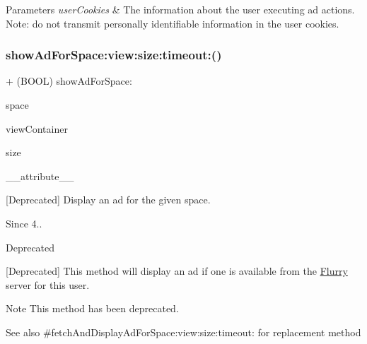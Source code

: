 \begin{DoxyParams}{Parameters}
{\em user\+Cookies} & The information about the user executing ad actions. Note\+: do not transmit personally identifiable information in the user cookies. \\
\hline
\end{DoxyParams}
\mbox{\label{interfaceFlurryAds_a8d460375f558369833a1f43e568ed137}} 
\subsubsection{\texorpdfstring{show\+Ad\+For\+Space\+:view\+:size\+:timeout\+:()}{showAdForSpace:view:size:timeout:()}}
{\footnotesize\ttfamily + (B\+O\+OL) show\+Ad\+For\+Space\+: \begin{DoxyParamCaption}\item[{(N\+S\+String $\ast$)}]{space }\item[{view:(U\+I\+View $\ast$)}]{view\+Container }\item[{size:(Flurry\+Ad\+Size)}]{size }\item[{timeout:((deprecated))}]{\+\_\+\+\_\+attribute\+\_\+\+\_\+ }\end{DoxyParamCaption}}



\mbox{[}Deprecated\mbox{]} Display an ad for the given {\ttfamily space}. 

\begin{DoxySince}{Since}
4.. 
\end{DoxySince}
\begin{DoxyRefDesc}{Deprecated}
\item[\hyperlink{deprecated__deprecated000229}{Deprecated}]\end{DoxyRefDesc}


\mbox{[}Deprecated\mbox{]} This method will display an ad if one is available from the \hyperlink{interfaceFlurry}{Flurry} server for this user.

\begin{DoxyNote}{Note}
This method has been deprecated.
\end{DoxyNote}
\begin{DoxySeeAlso}{See also}
\#fetch\+And\+Display\+Ad\+For\+Space\+:view\+:size\+:timeout\+: for replacement method
\end{DoxySeeAlso}

